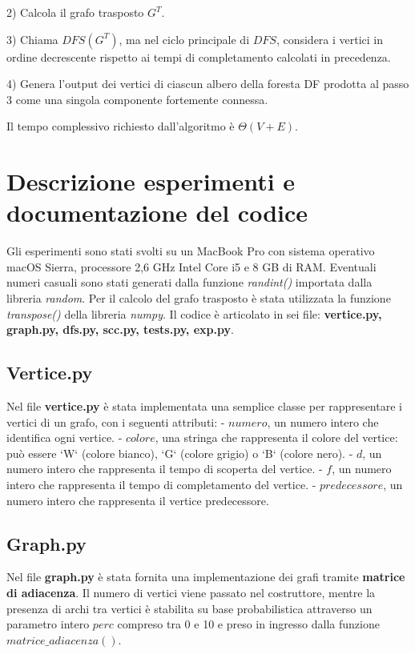 \documentclass[a4paper,12pt]{article}
\begin{document}
2) Calcola il grafo trasposto $G^T$.

3) Chiama $DFS(G^T)$, ma nel ciclo principale di $DFS$, considera i vertici in ordine decrescente rispetto ai tempi di completamento calcolati in precedenza.

4) Genera l'output dei vertici di ciascun albero della foresta DF prodotta al passo 3 come una singola componente fortemente connessa.
\newline

Il tempo complessivo richiesto dall'algoritmo è $\Theta(V +E)$.

\clearpage
\section{Descrizione esperimenti e documentazione del codice}
Gli esperimenti sono stati svolti su un MacBook Pro con sistema operativo macOS Sierra, processore 2,6 GHz Intel Core i5 e 8 GB di RAM.
\newline
\newline
Eventuali numeri casuali sono stati generati dalla funzione \textit{randint()} importata dalla libreria \textit{random}. Per il calcolo del grafo trasposto è stata utilizzata la funzione \textit{transpose()} della libreria \textit{numpy}.
\newline
\newline
Il codice è articolato in sei file: \textbf{vertice.py, graph.py, dfs.py, scc.py, tests.py, exp.py}.

\subsection{Vertice.py}
Nel file \textbf{vertice.py} è stata implementata una semplice classe per rappresentare i vertici di un grafo, con i seguenti attributi:
\newline
- $numero$, un numero intero che identifica ogni vertice. \newline
- $colore$, una stringa che rappresenta il colore del vertice: può essere `W` (colore bianco), `G` (colore grigio) o `B` (colore nero). \newline
- $d$, un numero intero che rappresenta il tempo di scoperta del vertice. \newline
- $f$, un numero intero che rappresenta il tempo di completamento del vertice. \newline
- $predecessore$, un numero intero che rappresenta il vertice predecessore.

\subsection{Graph.py}
Nel file \textbf{graph.py} è stata fornita una implementazione dei grafi tramite \textbf{matrice di adiacenza}. Il numero di vertici viene passato nel costruttore, mentre la presenza di archi tra vertici è stabilita su base probabilistica attraverso un parametro intero $perc$ compreso tra 0 e 10 e preso in ingresso dalla funzione $matrice\_adiacenza()$.
\end{document}
